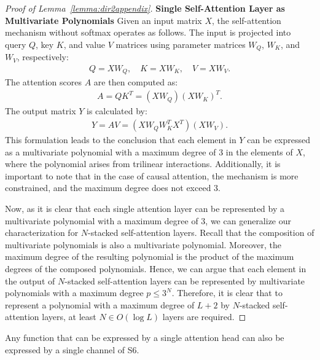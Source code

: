 \begin{proof}[Proof of Lemma~\ref{lemma:dir2appendix}]
\smallskip
\noindent\textbf{Single Self-Attention Layer as Multivariate Polynomials\quad} 
Given an input matrix $X$, the self-attention mechanism without softmax operates as follows. The input is projected into query $Q$, key $K$, and value $V$ matrices using parameter matrices $W_Q$, $W_K$, and $W_V$, respectively:
\begin{align*}
Q = X W_Q, \quad K = X W_K, \quad V = X W_V.
\end{align*}
The attention scores $A$ are then computed as:
\begin{align*}
A = Q K^T = (X W_Q)(X W_K)^T.
\end{align*}
The output matrix $Y$ is calculated by:
\begin{align*}
Y = A V = (X W_Q W_K^T X^T)(X W_V).
\end{align*}
This formulation leads to the conclusion that each element in $Y$ can be expressed as a multivariate polynomial with a maximum degree of 3 in the elements of $X$, where the polynomial arises from trilinear interactions. Additionally, it is important to note that in the case of causal attention, the mechanism is more constrained, and the maximum degree does not exceed 3.

Now, as it is clear that each single attention layer can be represented by a multivariate polynomial with a maximum degree of 3, we can generalize our characterization for $N$-stacked self-attention layers. Recall that the composition of multivariate polynomials is also a multivariate polynomial. Moreover, the maximum degree of the resulting polynomial is the product of the maximum degrees of the composed polynomials. Hence, we can argue that each element in the output of $N$-stacked self-attention layers can be represented by multivariate polynomials with a maximum degree $p \leq 3^N$. Therefore, it is clear that to represent a polynomial with a maximum degree of $L+2$ by $N$-stacked self-attention layers, at least $N \in O(\log L)$ layers are required.
\end{proof}


\begin{lemma}\label{lemma:dir1Appendix}
Any function that can be expressed by a single attention head can also be expressed by a single channel of S6.
\end{lemma}

